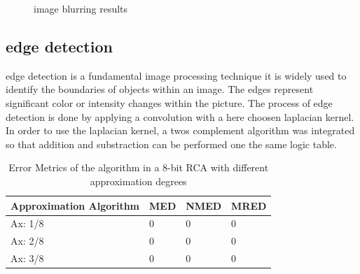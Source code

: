 \documentclass[]{IEEEconf}
\begin{document}
\begin{figure}[!htb]
	\centering
	\hfill
	\hfill
	\caption{image blurring results}
	\label{fig:whole}
\end{figure}%

\subsection{edge detection}
edge detection is a fundamental image processing technique it is widely used to identify the boundaries of objects within an image. The edges represent significant color or intensity changes within the picture. The process of edge detection is done by applying a convolution with a here choosen laplacian kernel. In order to use the laplacian kernel, a twos complement algorithm was integrated so that addition and substraction can be performed one the same logic table. 


\begin{table}[h]
\caption{Error Metrics of the algorithm in a 8-bit RCA with different approximation degrees}
\begin{tabular}{|l|l|l|l|}
\hline
 Approximation Algorithm & MED & NMED & MRED  \\ \hline
Ax: 1/8 & 0 & 0 & 0 \\ \hline
Ax: 2/8 & 0 & 0 & 0 \\ \hline
Ax: 3/8 & 0 & 0 & 0 \\ \hline
\end{tabular}
\end{table}
\end{document}
